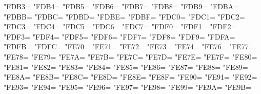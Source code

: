 \XeTeXcharclass"FDB3=\KclassArabU
\XeTeXcharclass"FDB4=\KclassArabU
\XeTeXcharclass"FDB5=\KclassArabU
\XeTeXcharclass"FDB6=\KclassArabU
\XeTeXcharclass"FDB7=\KclassArabU
\XeTeXcharclass"FDB8=\KclassArabU
\XeTeXcharclass"FDB9=\KclassArabU
\XeTeXcharclass"FDBA=\KclassArabU
\XeTeXcharclass"FDBB=\KclassArabU
\XeTeXcharclass"FDBC=\KclassArabU
\XeTeXcharclass"FDBD=\KclassArabU
\XeTeXcharclass"FDBE=\KclassArabU
\XeTeXcharclass"FDBF=\KclassArabU
\XeTeXcharclass"FDC0=\KclassArabU
\XeTeXcharclass"FDC1=\KclassArabU
\XeTeXcharclass"FDC2=\KclassArabU
\XeTeXcharclass"FDC3=\KclassArabU
\XeTeXcharclass"FDC4=\KclassArabU
\XeTeXcharclass"FDC5=\KclassArabU
\XeTeXcharclass"FDC6=\KclassArabU
\XeTeXcharclass"FDC7=\KclassArabU
\XeTeXcharclass"FDF0=\KclassArabU
\XeTeXcharclass"FDF1=\KclassArabU
\XeTeXcharclass"FDF2=\KclassArabU
\XeTeXcharclass"FDF3=\KclassArabU
\XeTeXcharclass"FDF4=\KclassArabU
\XeTeXcharclass"FDF5=\KclassArabU
\XeTeXcharclass"FDF6=\KclassArabU
\XeTeXcharclass"FDF7=\KclassArabU
\XeTeXcharclass"FDF8=\KclassArabU
\XeTeXcharclass"FDF9=\KclassArabU
\XeTeXcharclass"FDFA=\KclassArabU
\XeTeXcharclass"FDFB=\KclassArabU
\XeTeXcharclass"FDFC=\KclassArabU
\XeTeXcharclass"FE70=\KclassArabU
\XeTeXcharclass"FE71=\KclassArabU
\XeTeXcharclass"FE72=\KclassArabU
\XeTeXcharclass"FE73=\KclassArabU
\XeTeXcharclass"FE74=\KclassArabU
\XeTeXcharclass"FE76=\KclassArabU
\XeTeXcharclass"FE77=\KclassArabU
\XeTeXcharclass"FE78=\KclassArabU
\XeTeXcharclass"FE79=\KclassArabU
\XeTeXcharclass"FE7A=\KclassArabU
\XeTeXcharclass"FE7B=\KclassArabU
\XeTeXcharclass"FE7C=\KclassArabU
\XeTeXcharclass"FE7D=\KclassArabU
\XeTeXcharclass"FE7E=\KclassArabU
\XeTeXcharclass"FE7F=\KclassArabU
\XeTeXcharclass"FE80=\KclassArabU
\XeTeXcharclass"FE81=\KclassArabU
\XeTeXcharclass"FE82=\KclassArabU
\XeTeXcharclass"FE83=\KclassArabU
\XeTeXcharclass"FE84=\KclassArabU
\XeTeXcharclass"FE85=\KclassArabU
\XeTeXcharclass"FE86=\KclassArabU
\XeTeXcharclass"FE87=\KclassArabU
\XeTeXcharclass"FE88=\KclassArabU
\XeTeXcharclass"FE89=\KclassArabU
\XeTeXcharclass"FE8A=\KclassArabU
\XeTeXcharclass"FE8B=\KclassArabU
\XeTeXcharclass"FE8C=\KclassArabU
\XeTeXcharclass"FE8D=\KclassArabU
\XeTeXcharclass"FE8E=\KclassArabU
\XeTeXcharclass"FE8F=\KclassArabU
\XeTeXcharclass"FE90=\KclassArabU
\XeTeXcharclass"FE91=\KclassArabU
\XeTeXcharclass"FE92=\KclassArabU
\XeTeXcharclass"FE93=\KclassArabU
\XeTeXcharclass"FE94=\KclassArabU
\XeTeXcharclass"FE95=\KclassArabU
\XeTeXcharclass"FE96=\KclassArabU
\XeTeXcharclass"FE97=\KclassArabU
\XeTeXcharclass"FE98=\KclassArabU
\XeTeXcharclass"FE99=\KclassArabU
\XeTeXcharclass"FE9A=\KclassArabU
\XeTeXcharclass"FE9B=\KclassArabU
